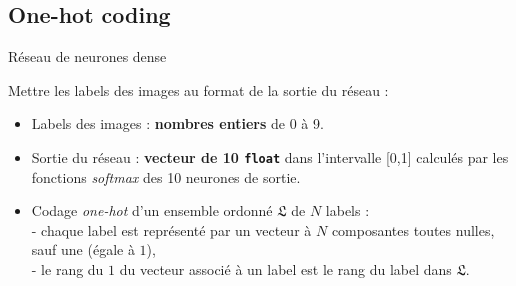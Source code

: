 \documentclass[10pt,serif,mathserif,compress,hyperref={colorlinks}]{beamer}
\begin{document}
\subsection{One-hot coding}

\begin{frame}{Réseau de neurones dense}

  \begin{tcolorbox}[title=Codage {\em One-hot} des labels]  

    Mettre les labels des images au format de la sortie du réseau :

    {\small
        \begin{itemize}
        \item Labels des images  : \textbf{nombres entiers} de 0 à 9.
        \item Sortie du réseau : \textbf{vecteur de 10 \texttt{float}} dans l'intervalle [0,1] calculés par les fonctions {\em softmax} des 10 neurones de sortie.
        \item Codage {\em one-hot} d'un ensemble ordonné $\mathfrak{L}$ de $N$ labels : \\[1mm]
          - chaque label est représenté par un vecteur à $N$ composantes toutes nulles, sauf une (égale à $1$),\\
          - le rang du $1$ du vecteur associé à un label est le rang du label dans $\mathfrak{L}$.
        \end{itemize}
      }
  \end{tcolorbox}  


\end{frame}
\end{document}
